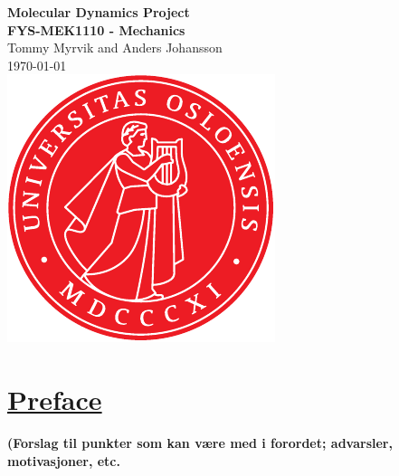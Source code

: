 \documentclass[11pt,british,a4paper]{report}
\begin{document}

\begin{titlepage}
\vspace*{\fill}
\begin{center}
\textsf{
    \Huge \textbf{Molecular Dynamics Project}\\\vspace{0.5cm}
    \Large \textbf{FYS-MEK1110 - Mechanics}\\
    \vspace{8cm}
    Tommy Myrvik and Anders Johansson\\
    \today\\
}
\vspace{1.5cm}
\includegraphics{uio.pdf}\\
\vspace*{\fill}
\end{center}
\end{titlepage}
\null
\pagestyle{empty}
\newpage

\pagestyle{fancy}
\setcounter{page}{1}
\setcounter{section}{-1}



\section{\underline{Preface}}

\textbf{(Forslag til punkter som kan være med i forordet; advarsler, motivasjoner, etc.}
\end{document}
